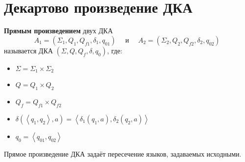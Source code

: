 \documentclass[11pt]{article}
\begin{document}
\section{Декартово произведение ДКА}

\begin{definition}
    \textbf{Прямым произведением} двух ДКА 
    \[A_1 = (\Sigma_1, Q_1, Q_{f1}, \delta_1, q_{01}) \quad \text{ и } \quad A_2 = (\Sigma_2, Q_2, Q_{f2}, \delta_2, q_{02})\]
    называется ДКА $(\Sigma, Q, Q_f, \delta, q_0)$, где:
    \begin{itemize}
        \item $\Sigma = \Sigma_1 \times \Sigma_2$
        \item $Q = Q_1 \times Q_2$
        \item $Q_f = Q_{f1} \times Q_{f2}$
        \item $\delta(\left\langle q_1, q_2 \right\rangle, a) = \left\langle \delta_1 (q_1, a), \delta_2 (q_2, a)\right\rangle$
        \item $q_0 = \left\langle q_{01}, q_{02} \right\rangle$
    \end{itemize}
\end{definition}

\begin{lemma}
    Прямое произведение ДКА задаёт пересечение языков, задаваемых исходными.
\end{lemma}
\end{document}
